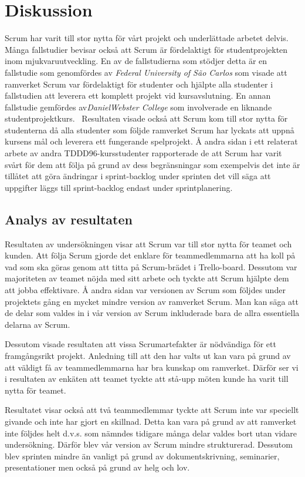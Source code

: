 
\section{Diskussion}
\label{sec:Lieth_Wahid-discussion}
Scrum har varit till stor nytta för vårt projekt och underlättade arbetet delvis. Många fallstudier bevisar också att Scrum är fördelaktigt för studentprojekten inom mjukvaruutveckling. En av de fallstudierna som stödjer detta är
en fallstudie som genomfördes av \textit{Federal University of São Carlos} som visade att ramverket Scrum var fördelaktigt för studenter och hjälpte alla studenter i fallstudien att leverera ett komplett projekt vid kursavslutning. En annan fallstudie gemfördes av\textit{DanielWebster College} som involverade en liknande studentprojektkurs.~\cite{GameDesign} Resultaten visade också att Scrum kom till stor nytta för studenterna då alla studenter som följde ramverket Scrum har lyckats att uppnå kursens mål och leverera ett fungerande spelprojekt. Å andra sidan i ett relaterat arbete av andra TDDD96-kursstudenter rapporterade de att Scrum har varit svårt för dem att följa på grund av dess begränsningar som exempelvis det inte är tillåtet att göra ändringar i sprint-backlog under sprinten det vill säga att uppgifter läggs till sprint-backlog endast under sprintplanering.~\cite{overvakn73:online}


\subsection{Analys av resultaten}
Resultaten av undersökningen visar att Scrum var till stor nytta för teamet och kunden. Att följa Scrum gjorde det enklare för teammedlemmarna att ha koll på vad som ska göras genom att titta på Scrum-brädet i Trello-board. Dessutom var majoriteten av teamet nöjda med sitt arbete och tyckte att Scrum hjälpte dem att jobba effektivare. Å andra sidan var versionen av Scrum som följdes under projektets gång en mycket mindre version av ramverket Scrum. Man kan säga att de delar som valdes in i vår version av Scrum inkluderade bara de allra essentiella delarna av Scrum.

Dessutom visade resultaten att vissa Scrumartefakter är nödvändiga för ett framgångsrikt projekt. Anledning till att den har valts ut kan vara på grund av att väldigt få av teammedlemmarna har bra kunskap om ramverket. Därför ser vi i resultaten av enkäten att teamet tyckte att stå-upp möten kunde ha varit till nytta för teamet. 

Resultatet visar också  att två teammedlemmar tyckte att Scrum inte var speciellt givande och inte har gjort en skillnad. Detta kan vara på grund av att ramverket inte följdes helt d.v.s. som nämndes tidigare många delar valdes bort utan vidare undersökning. Därför blev vår version av Scrum mindre strukturerad. Dessutom blev sprinten mindre än vanligt på grund av dokumentskrivning, seminarier, presentationer men också på grund av helg och lov.
